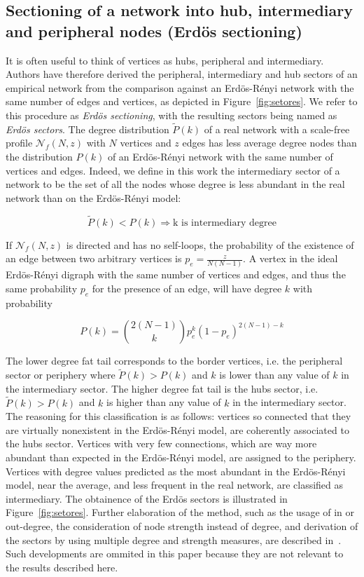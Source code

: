 \documentclass[review]{elsarticle}
\begin{document}
\subsection{Sectioning of a network into hub, intermediary and peripheral nodes (Erdös sectioning)}\label{ssec}
It is often useful to think of vertices as hubs, peripheral and intermediary.
Authors have therefore derived the peripheral, intermediary and hub sectors of an empirical network from the comparison against an Erd\"os-R\'enyi network with the same number of edges and vertices,
as depicted in Figure~\ref{fig:setores}. We refer to this procedure as \emph{Erd\"os sectioning}, with the resulting sectors being named as \emph{Erd\"os sectors}. The degree distribution $\widetilde{P}(k)$ of a real network with a scale-free profile $\mathcal{N}_f(N,z)$ with $N$ vertices and $z$ edges has less
average degree nodes than the distribution $P(k)$ of an Erd\"os-R\'enyi
network with the same number of vertices and edges. Indeed, we define in this work the intermediary sector of a network to be the set of all the nodes whose degree is less abundant in the real network than on the Erd\"os-R\'enyi model:

\begin{equation}\label{criterio}
\widetilde{P}(k)<P(k) \Rightarrow \text{k is intermediary degree}
\end{equation}

If $\mathcal{N}_f(N,z)$ is directed and has no self-loops, the probability of the existence
of an edge between two arbitrary vertices is $p_e=\frac{z}{N(N-1)}$.
A vertex in the ideal Erd\"os-R\'enyi digraph with the same number of vertices and edges, and thus the same probability $p_e$ for the presence of an edge, will have degree $k$ with probability

\begin{equation}
P(k)=\binom{2(N-1)}{k}p_e^k(1-p_e)^{2(N-1)-k}
\end{equation}

The lower degree fat tail corresponds to the border vertices, i.e. the peripheral sector or periphery where $\widetilde{P}(k)>P(k)$ and $k$ is lower than any value of $k$ in the intermediary sector.
The higher degree fat tail is the hubs sector, i.e. $\widetilde{P}(k)>P(k)$ and $k$ is higher than any value of $k$ in the intermediary sector. The reasoning for this classification is as follows: vertices so connected that they are virtually nonexistent in the Erd\"os-R\'enyi model, are coherently associated to the hubs sector.
Vertices with very few connections, which are way more abundant than expected in the Erd\"os-R\'enyi model,
are assigned to the periphery.
Vertices with degree values predicted as the most abundant in the Erd\"os-R\'enyi model,
near the average, and less frequent in the real network, are classified as intermediary.
The obtainence of the Erdös sectors is illustrated in Figure~\ref{fig:setores}.
Further elaboration of the method, such as the usage of in or out-degree, the consideration of node strength instead of degree, and derivation of the sectors by using multiple degree and strength measures, are described in~\cite{stab}.
Such developments are ommited in this paper because they are not relevant to the results described here.
\end{document}

